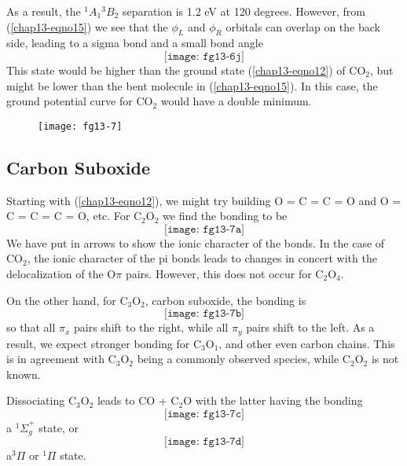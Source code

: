 As a result, the ${^1A}_1 {^3B}_2$ separation is 1.2 eV at 120
degrees.  However, from (\ref{chap13-eqno15}) we see that the $\phi_L$
and $\phi_R$ orbitals can overlap on the back side, leading to a sigma
bond and a small bond angle
\begin{equation}
\texttt{[image: fg13-6j]}
\end{equation}
This state would be higher than the ground state (\ref{chap13-eqno12})
of CO$_2$, but might be lower than the bent molecule in
(\ref{chap13-eqno15}).  In this case, the ground potential curve for
CO$_2$ would have a double minimum.

\begin{figure}
\texttt{[image: fg13-7]}
\caption{}
\label{chap13-fig7}
\end{figure}

\subsection{Carbon Suboxide}

Starting with (\ref{chap13-eqno12}), we might try building O = C = C =
O and O = C = C = C = O, etc.  For C$_2$O$_2$ we find the bonding to
be
\begin{equation}
\texttt{[image: fg13-7a]}
\end{equation}
We have put in arrows to show the ionic character of the bonds. In the case 
of CO$_2$, the ionic character of the pi bonds leads to changes in concert 
with the delocalization of the O$\pi$ pairs.  However, this does not occur 
for C$_2$O$_4$.

On the other hand, for C$_3$O$_2$, carbon suboxide, the bonding is
\begin{equation}
\texttt{[image: fg13-7b]}
\end{equation}
so that all $\pi_x$ pairs shift to the right, while all $\pi_y$ pairs shift to 
the left.  As a result, we expect stronger bonding for C$_3$O$_1$, and 
other even carbon chains.  This is in agreement
with C$_3$O$_2$ being a commonly observed species, while C$_2$O$_2$ is not known.

Dissociating C$_3$O$_2$ leads to CO + C$_2$O with the latter having the bonding
\begin{equation}
\texttt{[image: fg13-7c]}
\end{equation}
a ${^1\Sigma}^+_g$ state, or
\begin{equation}
\texttt{[image: fg13-7d]}
\end{equation}
a${^3\Pi}$ or ${^1\Pi}$ state.

